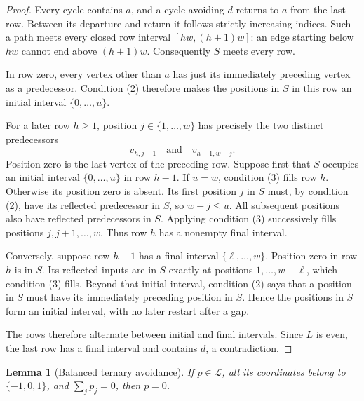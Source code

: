\documentclass[reqno]{amsart}
\newtheorem{lemma}[theorem]{Lemma}
\theoremstyle{remark}
\numberwithin{equation}{section}
\begin{document}
\begin{proof}
Every cycle contains $a$, and a cycle avoiding $d$ returns to $a$ from the
last row. Between its departure and return it follows strictly increasing
indices. Such a path meets every closed row interval $[hw,(h+1)w]$:
an edge starting below $hw$ cannot end above $(h+1)w$.
Consequently $S$ meets every row.

In row zero, every vertex other than $a$ has just its immediately preceding
vertex as a predecessor. Condition (2) therefore makes the positions in $S$
in this row an initial interval $\{0,\ldots,u\}$.

For a later row $h\geq1$, position $j\in\{1,\ldots,w\}$ has precisely the
two distinct predecessors
\begin{equation}\label{eq:predecessors}
 v_{h,j-1}\quad\text{and}\quad v_{h-1,w-j}.
\end{equation}
Position zero is the last vertex of the preceding row.
Suppose first that $S$ occupies an initial interval $\{0,\ldots,u\}$ in
row $h-1$. If $u=w$, condition (3) fills row $h$. Otherwise its position
zero is absent. Its first position $j$ in $S$ must, by condition (2), have
its reflected predecessor in $S$, so $w-j\leq u$. All subsequent positions
also have reflected predecessors in $S$. Applying condition (3) successively
fills positions $j,j+1,\ldots,w$. Thus row $h$ has a nonempty final interval.

Conversely, suppose row $h-1$ has a final interval $\{\ell,\ldots,w\}$.
Position zero in row $h$ is in $S$. Its reflected inputs are in $S$ exactly
at positions $1,\ldots,w-\ell$, which condition (3) fills. Beyond that
initial interval, condition (2) says that a position in $S$ must have its
immediately preceding position in $S$. Hence the positions in $S$ form an
initial interval, with no later restart after a gap.

The rows therefore alternate between initial and final intervals. Since
$L$ is even, the last row has a final interval and contains $d$, a contradiction.
\end{proof}

\begin{lemma}[Balanced ternary avoidance]\label{lem:avoidance}
If $p\in\mathcal L$, all its coordinates belong to $\{-1,0,1\}$, and
$\sum_jp_j=0$, then $p=0$.
\end{lemma}
\end{document}
